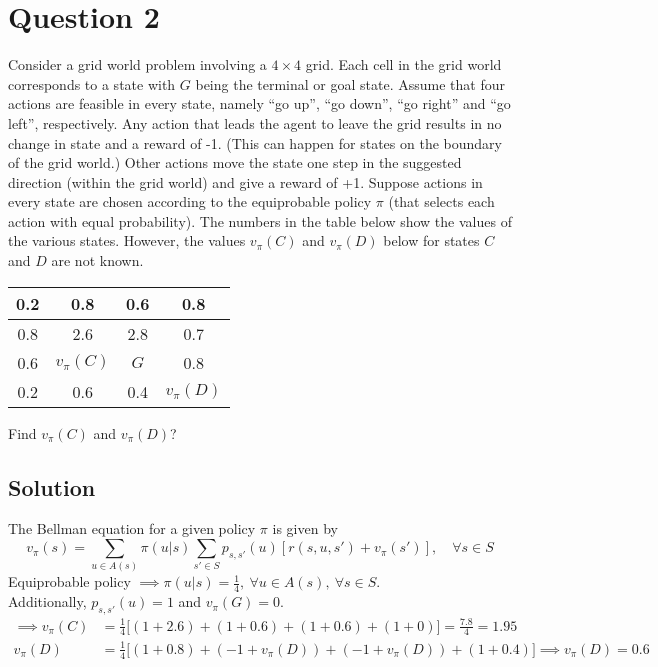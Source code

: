 \section*{Question 2}

Consider a grid world problem involving a \( 4 \times 4 \) grid.
Each cell in the grid world corresponds to a state with \( G \) being the terminal or goal state.
Assume that four actions are feasible in every state, namely ``go up'', ``go down'', ``go right'' and ``go left'', respectively.
Any action that leads the agent to leave the grid results in no change in state and a reward of -1.
(This can happen for states on the boundary of the grid world.)
Other actions move the state one step in the suggested direction (within the grid world) and give a reward of +1.
Suppose actions in every state are chosen according to the equiprobable policy \( \pi \) (that selects each action with equal probability).
The numbers in the table below show the values of the various states.
However, the values \( v_{\pi}(C) \) and \( v_{\pi}(D) \) below for states \( C \) and \( D \) are not known.
\begin{center}
    \begin{tabular}{|c|c|c|c|}
        \hline
        0.2 & 0.8              & 0.6     & 0.8              \\
        \hline
        0.8 & 2.6              & 2.8     & 0.7              \\
        \hline
        0.6 & \( v_{\pi}(C) \) & \( G \) & 0.8              \\
        \hline
        0.2 & 0.6              & 0.4     & \( v_{\pi}(D) \) \\
        \hline
    \end{tabular}
\end{center}
Find \( v_{\pi}(C) \) and \( v_{\pi}(D) \)?

\subsection*{Solution}

The Bellman equation for a given policy \( \pi \) is given by
\[
    v_{\pi}(s) = \sum_{u \in A(s)} \pi(u|s) \sum_{s' \in S} p_{s, s'}(u) \left[ r(s, u, s') + v_{\pi}(s') \right], \quad \forall s \in S
\]
Equiprobable policy \( \implies \pi(u|s) = \frac{1}{4}, \ \forall u \in A(s), \ \forall s \in S \).\\
Additionally, \( p_{s, s'}(u) = 1 \) and \( v_\pi(G) = 0 \).
\begin{align*}
    \implies
    v_{\pi}(C)
     & =
    \frac{1}{4} \Big[ (1 + 2.6) + (1 + 0.6) + (1 + 0.6) + (1 + 0) \Big]
    = \frac{7.8}{4} = 1.95
    \\
    v_{\pi}(D)
     & =
    \frac{1}{4} \Big[ (1 + 0.8) + (-1 + v_{\pi}(D)) + (-1 + v_{\pi}(D)) + (1 + 0.4) \Big]
    \implies
    v_{\pi}(D) = 0.6
\end{align*}
